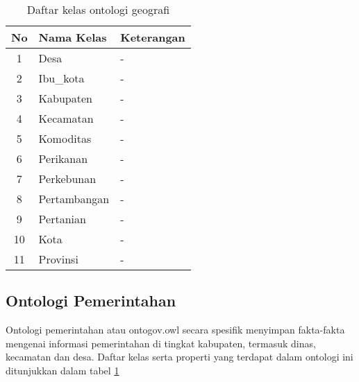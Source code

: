 \begin{table}[ht]
	\caption{Daftar kelas ontologi geografi}
	\label{table:ontogeo_class}
	\begin{tabularx}{\textwidth}{|c|X|X|}
		\hline
		No & Nama Kelas & Keterangan \\
		\hline
		1 & Desa & - \\
		\hline
		2 & Ibu\_kota & - \\
		\hline
		3 & Kabupaten & - \\
		\hline
		4 & Kecamatan & - \\
		\hline
		5 & Komoditas & - \\
		\hline
		6 & Perikanan & - \\
		\hline
		7 & Perkebunan & - \\
		\hline
		8 & Pertambangan & - \\
		\hline
		9 & Pertanian & - \\
		\hline
		10 & Kota & - \\
		\hline
		11 & Provinsi & - \\
		\hline
	\end{tabularx}
\end{table}

\subsection{Ontologi Pemerintahan}
Ontologi pemerintahan atau ontogov.owl secara spesifik menyimpan fakta-fakta mengenai informasi pemerintahan di tingkat kabupaten, termasuk dinas, kecamatan dan desa. Daftar kelas serta properti yang terdapat dalam ontologi ini ditunjukkan dalam tabel \ref{table:ontogeo_class}


